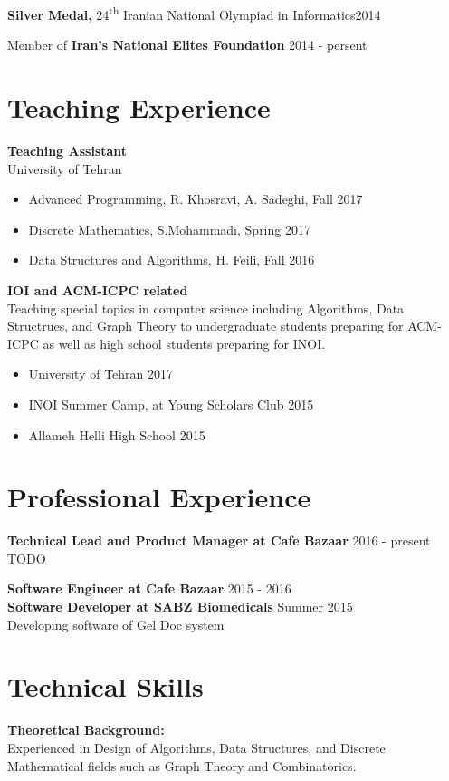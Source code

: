 \documentclass[margin]{res}
\begin{document}
\begin{resume}
    {\bf Silver Medal,} 24\textsuperscript{th} Iranian National Olympiad in Informatics\hfill 2014

    Member of {\bf Iran's National Elites Foundation} \hfill 2014 - persent

\section{Teaching Experience}
	{\bf Teaching Assistant}
	\\University of Tehran
	\begin{itemize}
		\item Advanced Programming, R. Khosravi, A. Sadeghi, Fall 2017
		\item Discrete Mathematics, S.Mohammadi, Spring 2017
	    \item Data Structures and Algorithms, H. Feili, Fall 2016
	\end{itemize}

    {\bf IOI and ACM-ICPC related}
    \\Teaching special topics in computer science including Algorithms, Data Structrues,
    and Graph Theory to undergraduate students preparing for ACM-ICPC as well as high school
    students preparing for INOI.
    
    	\begin{itemize}
		\item University of Tehran \hfill 2017
		\item INOI Summer Camp, at Young Scholars Club \hfill 2015
	    \item Allameh Helli High School \hfill 2015
	\end{itemize}

\section{Professional Experience}
    {\bf Technical Lead and Product Manager at Cafe Bazaar} \hfill 2016 - present
    \\ TODO
    
    {\bf Software Engineer at Cafe Bazaar} \hfill 2015 - 2016
    \\ 
    
    {\bf Software Developer at SABZ Biomedicals} \hfill Summer 2015
    \\Developing software of Gel Doc system

\section{Technical Skills} 
    {\bf Theoretical Background:}
    \\Experienced in Design of Algorithms, Data Structures, and Discrete Mathematical fields such as Graph Theory and Combinatorics.


\end{resume}
\end{document}
